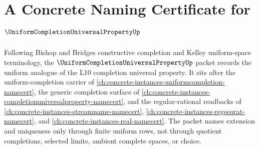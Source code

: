 \chapter{A Concrete Naming Certificate for $\UniformCompletionUniversalPropertyUp$}
\label{ch:concrete-instances-uniform-completion-universal-property-namecert}

Following Bishop and Bridges constructive completion and Kelley uniform-space terminology, the $\UniformCompletionUniversalPropertyUp$ packet records the uniform analogue of the L10 completion universal property. It sits after the uniform-completion carrier of \autoref{ch:concrete-instances-uniformcompletion-namecert}, the generic completion surface of \autoref{ch:concrete-instances-completionuniversalproperty-namecert}, and the regular-rational readbacks of \autoref{ch:concrete-instances-streamname-namecert}, \autoref{ch:concrete-instances-regseqrat-namecert}, and \autoref{ch:concrete-instances-real-namecert}. The packet names extension and uniqueness only through finite uniform rows, not through quotient completions, selected limits, ambient complete spaces, or choice.

